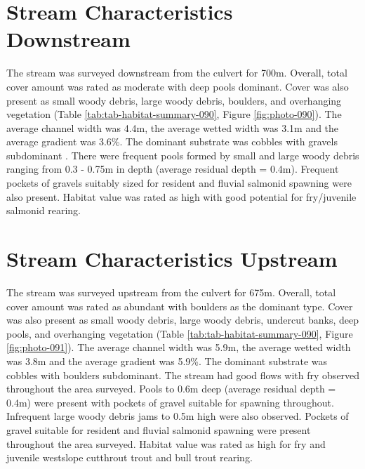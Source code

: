 \documentclass[
]{book}
\begin{document}
\hypertarget{stream-characteristics-downstream-6}{%
\section*{Stream Characteristics Downstream}\label{stream-characteristics-downstream-6}}

The stream was surveyed downstream from the culvert for 700m. Overall, total cover amount was rated as moderate with deep pools dominant. Cover was also present as small woody debris, large woody debris, boulders, and overhanging vegetation (Table \ref{tab:tab-habitat-summary-090}, Figure \ref{fig:photo-090}). The average channel width was 4.4m, the average wetted width was 3.1m and the average gradient was 3.6\%. The dominant substrate was cobbles with gravels subdominant . There were frequent pools formed by small and large woody debris ranging from 0.3 - 0.75m in depth (average residual depth = 0.4m). Frequent pockets of gravels suitably sized for resident and fluvial salmonid spawning were also present. Habitat value was rated as high with good potential for fry/juvenile salmonid rearing.

\hypertarget{stream-characteristics-upstream-6}{%
\section*{Stream Characteristics Upstream}\label{stream-characteristics-upstream-6}}

The stream was surveyed upstream from the culvert for 675m. Overall, total cover amount was rated as abundant with boulders as the dominant type. Cover was also present as small woody debris, large woody debris, undercut banks, deep pools, and overhanging vegetation (Table \ref{tab:tab-habitat-summary-090}, Figure \ref{fig:photo-091}). The average channel width was 5.9m, the average wetted width was 3.8m and the average gradient was 5.9\%. The dominant substrate was cobbles with boulders subdominant. The stream had good flows with fry observed throughout the area surveyed. Pools to 0.6m deep (average residual depth = 0.4m) were present with pockets of gravel suitable for spawning throughout. Infrequent large woody debris jams to 0.5m high were also observed. Pockets of gravel suitable for resident and fluvial salmonid spawning were present throughout the area surveyed. Habitat value was rated as high for fry and juvenile westslope cutthrout trout and bull trout rearing.
\end{document}
